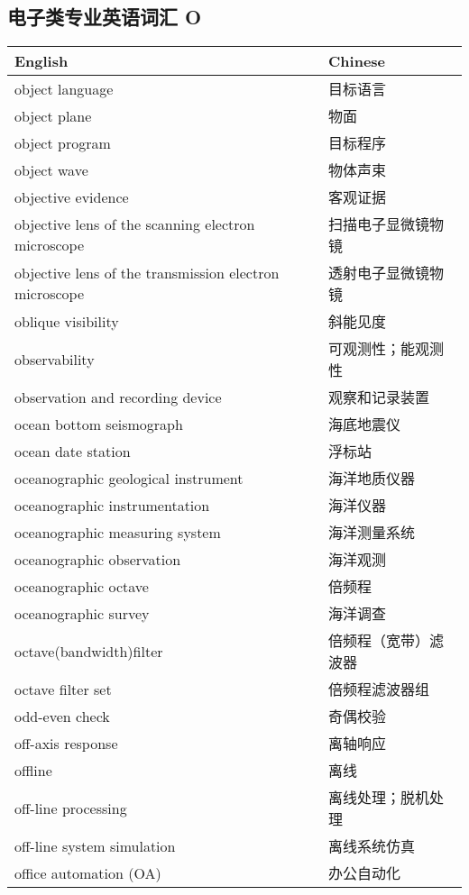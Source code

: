 \documentclass[
]{article}
\begin{document}
\hypertarget{ux7535ux5b50ux7c7bux4e13ux4e1aux82f1ux8bedux8bcdux6c47-o}{%
\subsection{\texorpdfstring{电子类专业英语词汇 O
}{电子类专业英语词汇 O }}\label{ux7535ux5b50ux7c7bux4e13ux4e1aux82f1ux8bedux8bcdux6c47-o}}

\begin{longtable}[]{@{}ll@{}}
\toprule()
English & Chinese \\
\midrule()
\endhead
object language & 目标语言 \\
object plane & 物面 \\
object program & 目标程序 \\
object wave & 物体声束 \\
objective evidence & 客观证据 \\
objective lens of the scanning electron microscope &
扫描电子显微镜物镜 \\
objective lens of the transmission electron microscope &
透射电子显微镜物镜 \\
oblique visibility & 斜能见度 \\
observability & 可观测性；能观测性 \\
observation and recording device & 观察和记录装置 \\
ocean bottom seismograph & 海底地震仪 \\
ocean date station & 浮标站 \\
oceanographic geological instrument & 海洋地质仪器 \\
oceanographic instrumentation & 海洋仪器 \\
oceanographic measuring system & 海洋测量系统 \\
oceanographic observation & 海洋观测 \\
oceanographic octave & 倍频程 \\
oceanographic survey & 海洋调查 \\
octave(bandwidth)filter & 倍频程（宽带）滤波器 \\
octave filter set & 倍频程滤波器组 \\
odd-even check & 奇偶校验 \\
off-axis response & 离轴响应 \\
offline & 离线 \\
off-line processing & 离线处理；脱机处理 \\
off-line system simulation & 离线系统仿真 \\
office automation (OA) & 办公自动化 \\

\end{longtable}
\end{document}
